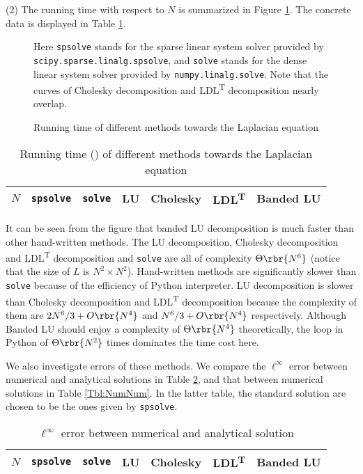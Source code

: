 \documentclass[english, nochinese]{pnote}
\begin{document}
(2) The running time with respect to $N$ is summarized in Figure \ref{Fig:Time}. The concrete data is displayed in Table \ref{Tbl:RunTime}.

\begin{figure}[htb]
{
\centering

\caption{Running time of different methods towards the Laplacian equation}
\label{Fig:Time}
}
{
\small
Here \verb"spsolve" stands for the sparse linear system solver provided by \verb"scipy.sparse.linalg.spsolve", and \verb"solve" stands for the dense linear system solver provided by \verb"numpy.linalg.solve". Note that the curves of Cholesky decomposition and LDL\textsuperscript{T} decomposition nearly overlap.
}
\end{figure}
\begin{table}[htb]
\centering
\small
\begin{tabular}{|c|c|c|c|c|c|c|}
\hline
$N$ & \verb"spsolve" & \verb"solve" & LU & Cholesky & LDL\textsuperscript{T} & Banded LU \\
\hline

\end{tabular}
\caption{Running time () of different methods towards the Laplacian equation}
\label{Tbl:RunTime}
\end{table}

It can be seen from the figure that banded LU decomposition is much faster than other hand-written methods. The LU decomposition, Cholesky decomposition and LDL\textsuperscript{T} decomposition and \verb"solve" are all of complexity $ \Theta \rbr{N^6} $ (notice that the size of $L$ is $ N^2 \times N^2 $). Hand-written methods are significantly slower than \verb"solve" because of the efficiency of Python interpreter. LU decomposition is slower than Cholesky decomposition and LDL\textsuperscript{T} decomposition because the complexity of them are $ 2 N^6 / 3 + O \rbr{N^4} $ and $ N^6 / 3 + O \rbr{N^4} $ respectively. Although Banded LU should enjoy a complexity of $ \Theta \rbr{N^4} $ theoretically, the loop in Python of $ \Theta \rbr{N^2} $ times dominates the time cost here.

We also investigate errors of these methods. We compare the $\ell^{\infty}$ error between numerical and analytical solutions in Table \ref{Tbl:NumAna}, and that between numerical solutions in Table \ref{Tbl:NumNum}. In the latter table, the standard solution are chosen to be the ones given by \verb"spsolve".

\begin{table}[htb]
\centering
\small
\begin{tabular}{|c|c|c|c|c|c|c|}
\hline
$N$ & \verb"spsolve" & \verb"solve" & LU & Cholesky & LDL\textsuperscript{T} & Banded LU \\
\hline

\end{tabular}
\caption{$\ell^{\infty}$ error between numerical and analytical solution}
\label{Tbl:NumAna}
\end{table}
\end{document}
